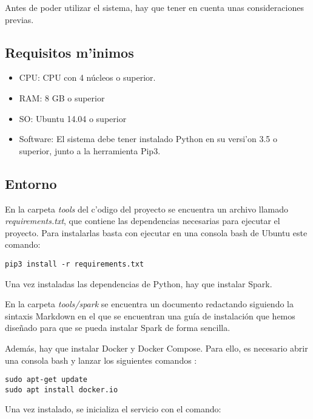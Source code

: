 Antes de poder utilizar el sistema, hay que tener en cuenta unas consideraciones previas.

\subsection{Requisitos m'inimos}

\begin{itemize}
\item CPU: CPU con 4 núcleos o superior.
\item RAM: 8 GB o superior
\item SO: Ubuntu 14.04 o superior
\item Software: El sistema debe tener instalado Python en su versi'on 3.5 o superior, junto a la herramienta Pip3.
\end{itemize}

\subsection{Entorno}

En la carpeta \emph{tools} del c'odigo del proyecto se encuentra un archivo llamado \textit{requirements.txt}, que contiene las dependencias necesarias para ejecutar el proyecto. Para instalarlas basta con ejecutar en una consola bash de Ubuntu este comando:


\begin{lstlisting}
pip3 install -r requirements.txt
\end{lstlisting}

\clearpage

Una vez instaladas las dependencias de Python, hay que instalar Spark. 

En la carpeta \emph{tools/spark} se encuentra un documento redactando siguiendo la sintaxis Markdown en el que se encuentran una guía de instalación que hemos diseñado para que se pueda instalar Spark de forma sencilla.

Además, hay que instalar Docker y Docker Compose. Para ello, es necesario abrir una consola bash y lanzar los siguientes comandos :

\begin{lstlisting}
sudo apt-get update
sudo apt install docker.io
\end{lstlisting}

Una vez instalado, se inicializa el servicio con el comando:

